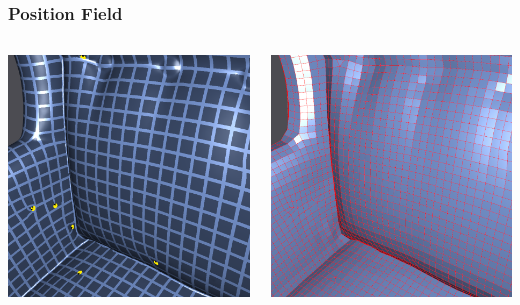 \documentclass[aspectratio=43,sanserif,professionalfonts]{beamer}
\begin{document}
\begin{frame}
	\frametitle{Position Field}
	\begin{columns}
		\begin{column}{0.5\textwidth}
			\center
			\includegraphics[width=\textwidth]{img/position.png}
		\end{column}
		\begin{column}{0.5\textwidth}
			\center
			\includegraphics[width=\textwidth]{img/output-pure.png}
		\end{column}
	\end{columns}
\end{frame}
\end{document}
